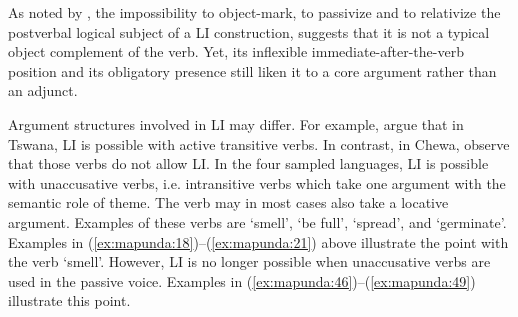 \documentclass[output=paper ]{langscibook}
\begin{document}
\z

As noted by \citet{BresnanKanerva1989}, the impossibility to object-mark, to passivize and to relativize the postverbal logical subject of a LI construction, suggests that it is not a typical object complement of the verb. Yet, its inflexible immediate-after-the-verb position and its obligatory presence still liken it to a core argument rather than an adjunct.  

Argument structures involved in LI may differ. For example, \citet{DemuthMmusi1997} argue that in Tswana, LI is possible with active transitive verbs. In contrast, in Chewa, \citet{BresnanKanerva1989} observe that those verbs do not allow LI. In the four sampled languages, LI is possible with unaccusative verbs, i.e. intransitive verbs which take one argument with the semantic role of theme. The verb may in most cases also take a locative argument. Examples of these verbs are ‘smell’, ‘be full’, ‘spread’, and ‘germinate’. Examples in (\ref{ex:mapunda:18})--(\ref{ex:mapunda:21}) above illustrate the point with the verb ‘smell’. However, LI is no longer possible when unaccusative verbs are used in the passive voice. Examples in (\ref{ex:mapunda:46})--(\ref{ex:mapunda:49}) illustrate this point. 






\end{document}
